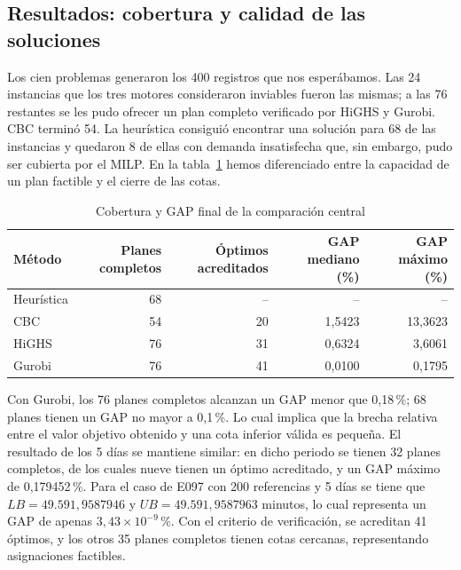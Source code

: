 \subsection{Resultados: cobertura y calidad de las soluciones}
Los cien problemas generaron los 400 registros que nos esperábamos. Las 24 instancias que los tres motores consideraron inviables fueron las mismas; a las 76 restantes se les pudo ofrecer un plan completo verificado por HiGHS y Gurobi. CBC terminó 54. La heurística consiguió encontrar una solución para 68 de las instancias y quedaron 8 de ellas con demanda insatisfecha que, sin embargo, pudo ser cubierta por el MILP. En la tabla~\ref{tab:solvers100} hemos diferenciado entre la capacidad de un plan factible y el cierre de las cotas.

\begin{table}[H]\centering\footnotesize\setlength{\tabcolsep}{5pt}
\caption{Cobertura y GAP final de la comparación central}\label{tab:solvers100}
\begin{tabular}{lrrrr}\toprule
Método & Planes completos & Óptimos acreditados & GAP mediano (\%) & GAP máximo (\%)\\\midrule
Heurística & 68 & -- & -- & --\\
CBC & 54 & 20 & 1,5423 & 13,3623\\
HiGHS & 76 & 31 & 0,6324 & 3,6061\\
Gurobi & 76 & 41 & 0,0100 & 0,1795\\\bottomrule
\end{tabular}
\end{table}

Con Gurobi, los 76 planes completos alcanzan un GAP menor que 0,18\,\%; 68 planes tienen un GAP no mayor a 0,1\,\%. Lo cual implica que la brecha relativa entre el valor objetivo obtenido y una cota inferior válida es pequeña. El resultado de los 5 días se mantiene similar: en dicho periodo se tienen 32 planes completos, de los cuales nueve tienen un óptimo acreditado, y un GAP máximo de 0,179452\,\%. Para el caso de E097 con 200 referencias y 5 días se tiene que $LB=49.591,9587946$ y $UB=49.591,9587963$ minutos, lo cual representa un GAP de apenas $3,43\times10^{-9}\,\%$. Con el criterio de verificación, se acreditan 41 óptimos, y los otros 35 planes completos tienen cotas cercanas, representando asignaciones factibles.

